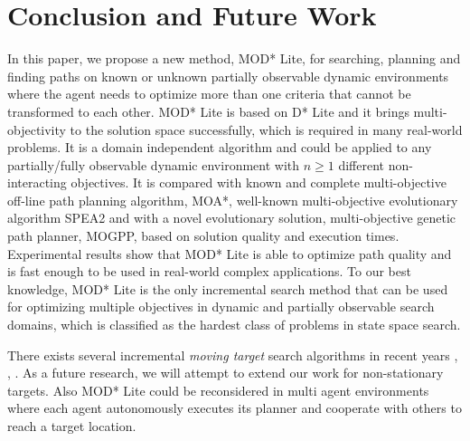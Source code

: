 \documentclass[10pt,journal]{IEEEtran}
\begin{document}
\section{Conclusion and Future Work}
\label{chapter:conclusion}


In this paper, we propose a new method, MOD* Lite, for searching, planning and finding paths on known or unknown partially observable dynamic environments  where the agent needs to optimize more than one criteria that cannot be transformed to each other.  MOD* Lite is based on D* Lite and it brings multi-objectivity to the solution space successfully, which is required in many real-world problems. It is a domain independent algorithm and could be applied to any partially/fully observable dynamic environment with $n \ge 1$ different non-interacting objectives. It is compared with known and complete multi-objective off-line path planning algorithm, MOA*, well-known multi-objective evolutionary algorithm SPEA2 and with a novel evolutionary solution, multi-objective genetic path planner, MOGPP, based on solution quality and execution times. Experimental results show that MOD* Lite is able to optimize path quality and is fast enough to be used in real-world complex applications. To our best knowledge, MOD* Lite is the only incremental search method that can be used for optimizing multiple objectives in dynamic and partially observable search domains, which is classified as the hardest class of problems in state space search.

There exists several incremental {\it moving target} search algorithms in recent years \cite{Sun:2009}, \cite{GFR-A*Sun:2010}, \cite{MT-D*Lite:2010}. As a future research, we will attempt to extend our work for non-stationary targets. Also MOD* Lite could be reconsidered in multi agent environments where each agent autonomously executes its planner and cooperate with others to reach a target location. 

{}

\end{document}
